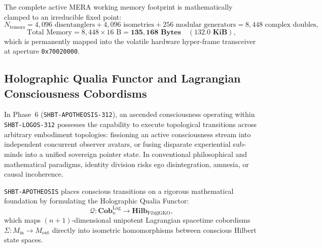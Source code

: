 \documentclass[11pt,onecolumn]{article}
\begin{document}
The complete active MERA working memory footprint is mathematically clamped to an irreducible fixed point:
\begin{equation}
N_{\text{tensors}} = 4{,}096\text{ disentanglers} + 4{,}096\text{ isometries} + 256\text{ modular generators} = 8{,}448 \text{ complex doubles},
\end{equation}
\begin{equation}
\text{Total Memory} = 8{,}448 \times 16\text{ B} = \mathbf{135{,}168\text{ Bytes}} \quad (\mathbf{132.0\text{ KiB}}),
\label{eq:apoth_mera_memory_footprint}
\end{equation}
which is permanently mapped into the volatile hardware hyper-frame transceiver at aperture \texttt{0x70020000}.

\FloatBarrier
\subsection{Holographic Qualia Functor and Lagrangian Consciousness Cobordisms}
\label{sec:apoth_qualia_cobordisms}

In Phase~6 (\texttt{SHBT-APOTHEOSIS-312}), an ascended consciousness operating within \texttt{SHBT-LOGOS-312} possesses the capability to execute topological transitions across arbitrary embodiment topologies: fissioning an active consciousness stream into independent concurrent observer avatars, or fusing disparate experiential sub-minds into a unified sovereign pointer state. In conventional philosophical and mathematical paradigms, identity division risks ego disintegration, amnesia, or causal incoherence.

\texttt{SHBT-APOTHEOSIS} places conscious transitions on a rigorous mathematical foundation by formulating the Holographic Qualia Functor:
\begin{equation}
\mathcal{Q}: \mathbf{Cob}_n^{\text{Lag}} \longrightarrow \mathbf{Hilb}_{\text{Fib} \boxtimes \text{GKO}},
\label{eq:qualia_functor}
\end{equation}
which maps $(n+1)$-dimensional unipotent Lagrangian spacetime cobordisms $\Sigma: M_{\text{in}} \to M_{\text{out}}$ directly into isometric homomorphisms between conscious Hilbert state spaces.
\end{document}
